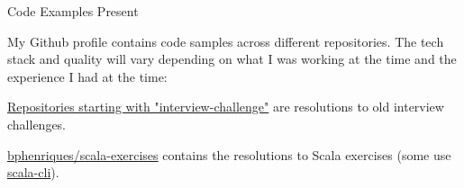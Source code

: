\begin{cventries}
\openSourceEntry
    {Code Examples}
    {Present}
    {   
    \begin{openSourceDescription}
    My Github profile contains code samples across different repositories. The tech stack and quality will vary depending on what I was working at the time and the experience I had at the time:
    \end{openSourceDescription}
    \vspace{8mm}
    \begin{openSourceItems}
        \item \href{https://github.com/bphenriques?tab=repositories&q=interview-challenge&type=&language=&sort=}{Repositories starting with "interview-challenge"} are resolutions to old interview challenges.
        \item \href{https://github.com/bphenriques/scala-exercises}{bphenriques/scala-exercises} contains the resolutions to Scala exercises (some use \href{https://scala-cli.virtuslab.org/}{scala-cli}).
    \end{openSourceItems}
    \vspace{4mm}
    }
    
\end{cventries}

